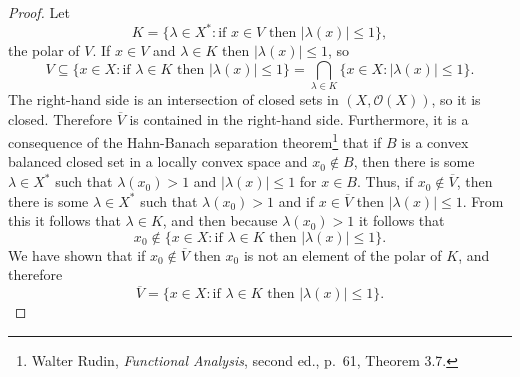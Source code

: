 \documentclass{article}
\begin{document}
\begin{proof}
Let
\[
K=\{\lambda \in X^*:\textrm{if $x \in V$ then $|\lambda(x)| \leq 1$}\},
\]
 the polar of $V$. If $x \in V$ and $\lambda \in K$ then $|\lambda(x)| \leq 1$, so 
\[
V \subseteq \{x \in X: \textrm{if $\lambda \in K$ then $|\lambda(x)| \leq 1$}\}=\bigcap_{\lambda \in K} \{x \in X: |\lambda(x)| \leq 1\}.
\]
The right-hand side is an intersection of closed sets in $(X,\mathcal{O}(X))$, so it is closed. Therefore $\overline{V}$ is contained in the right-hand side.
Furthermore, it is a consequence of the Hahn-Banach separation theorem\footnote{Walter
Rudin, {\em Functional Analysis}, second ed., p.~61, Theorem 3.7.}  that if $B$ is a convex balanced closed set in a locally
convex space and $x_0 \not \in B$, then there is some $\lambda \in X^*$ such that $\lambda (x_0) > 1$ and $|\lambda(x)| \leq 1$ for $x \in B$.
Thus, if $x_0 \not \in \overline{V}$, then
there is some $\lambda \in X^*$ such that $\lambda (x_0)>1$ and if 
$x \in \overline{V}$
then $|\lambda(x)| \leq 1$. From this it follows that $\lambda \in K$, and then because $\lambda(x_0)>1$ it follows that
\[
x_0 \not \in \{x \in X: \textrm{if $\lambda \in K$ then $|\lambda(x)| \leq 1$}\}.
\]
We have shown that if $x_0 \not \in \overline{V}$ then $x_0$ is not an element of the polar of $K$, and
therefore 
\[
\overline{V}= \{x \in X: \textrm{if $\lambda \in K$ then $|\lambda(x)| \leq 1$}\}.
\]


\end{proof}
\end{document}
